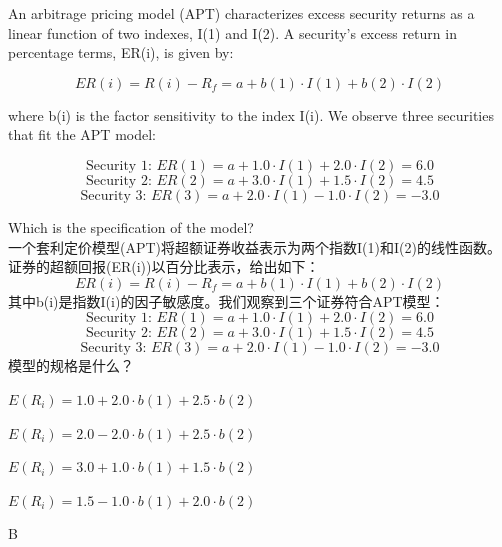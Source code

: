 \documentclass{article}
\newcounter{question} %
\begin{document}
\begin{question}
    An arbitrage pricing model (APT) characterizes excess security returns as a linear function of two indexes, I(1) and I(2). A security's excess return in percentage terms, ER(i), is given by:
    
    \[
    ER(i) = R(i) - R_f = a + b(1) \cdot I(1) + b(2) \cdot I(2)
    \]
    
    where b(i) is the factor sensitivity to the index I(i). We observe three securities that fit the APT model:
    
    \[
    \text{Security 1: } ER(1) = a + 1.0 \cdot I(1) + 2.0 \cdot I(2) = 6.0
    \]
    \[
    \text{Security 2: } ER(2) = a + 3.0 \cdot I(1) + 1.5 \cdot I(2) = 4.5
    \]
    \[
    \text{Security 3: } ER(3) = a + 2.0 \cdot I(1) - 1.0 \cdot I(2) = -3.0
    \]
    
    Which is the specification of the model?
    \\    一个套利定价模型(APT)将超额证券收益表示为两个指数I(1)和I(2)的线性函数。证券的超额回报(ER(i))以百分比表示，给出如下：
    \[
    ER(i) = R(i) - R_f = a + b(1) \cdot I(1) + b(2) \cdot I(2)
    \]
    其中b(i)是指数I(i)的因子敏感度。我们观察到三个证券符合APT模型：
    \[
    \text{Security 1: } ER(1) = a + 1.0 \cdot I(1) + 2.0 \cdot I(2) = 6.0
    \]
    \[
    \text{Security 2: } ER(2) = a + 3.0 \cdot I(1) + 1.5 \cdot I(2) = 4.5
    \]
    \[
    \text{Security 3: } ER(3) = a + 2.0 \cdot I(1) - 1.0 \cdot I(2) = -3.0
    \]
    模型的规格是什么？
\end{question}

\begin{choices}
    \item $E(R_i) = 1.0 + 2.0 \cdot b(1) + 2.5 \cdot b(2)$
    \item $E(R_i) = 2.0 - 2.0 \cdot b(1) + 2.5 \cdot b(2)$
    \item $E(R_i) = 3.0 + 1.0 \cdot b(1) + 1.5 \cdot b(2)$
    \item $E(R_i) = 1.5 - 1.0 \cdot b(1) + 2.0 \cdot b(2)$
\end{choices}

\begin{correctanswer}
    B
\end{correctanswer}
\end{document}
